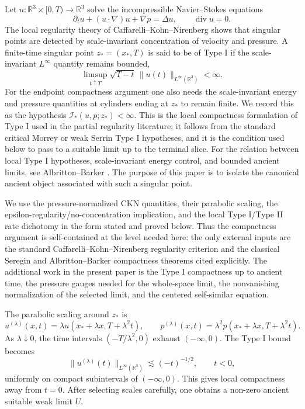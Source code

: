 \documentclass[11pt]{amsart}
\theoremstyle{plain}
\theoremstyle{definition}
\theoremstyle{remark}
\numberwithin{equation}{section}
\newcommand{\R}{\mathbb R}
\newcommand{\divergence}{\operatorname{div}}
\newcommand{\calI}{\mathcal I}
\begin{document}
Let \(u:\R^3\times[0,T)\to\R^3\) solve the incompressible Navier--Stokes
equations
\begin{equation}\label{eq:NS}
   \partial_t u+(u\cdot\nabla)u+\nabla p=\Delta u,\qquad
   \divergence u=0.
\end{equation}
The local regularity theory of Caffarelli--Kohn--Nirenberg
\cite{CKN1982} shows that singular points are detected by scale-invariant
concentration of velocity and pressure.  A finite-time singular point
\(z_*=(x_*,T)\) is said to be of Type I if the scale-invariant \(L^\infty\)
quantity remains bounded,
\begin{equation}\label{eq:type-I-bound-intro}
   \limsup_{t\uparrow T}\sqrt{T-t}\,
   \|u(t)\|_{L^\infty(\R^3)}<\infty.
\end{equation}
For the endpoint compactness argument one also needs the scale-invariant
energy and pressure quantities at cylinders ending at \(z_*\) to remain
finite.  We record this as the hypothesis
\(\calI_*(u,p;z_*)<\infty\).  This is the local compactness formulation of
Type I used in the partial regularity literature; it follows from the standard
critical Morrey or weak Serrin Type I hypotheses, and it is the condition used
below to pass to a suitable limit up to the terminal slice.
For the relation between local Type I hypotheses, scale-invariant energy
control, and bounded ancient limits, see Albritton--Barker
\cite[Theorem 1.1]{AlbrittonBarker2019}.
The purpose of this paper is to isolate the canonical ancient object associated
with such a singular point.

We use the pressure-normalized CKN quantities, their parabolic scaling, the
epsilon-regularity/no-concentration implication, and the local Type I/Type II
rate dichotomy in the form stated and proved below.  Thus the compactness
argument is self-contained at the level needed here: the only external inputs
are the standard Caffarelli--Kohn--Nirenberg regularity criterion and the
classical Seregin and Albritton--Barker compactness theorems cited explicitly.
The additional work in the present paper is the Type I compactness up to
ancient time, the pressure gauges needed for the whole-space limit, the
nonvanishing normalization of the selected limit, and the centered
self-similar equation.

The parabolic scaling around \(z_*\) is
\begin{equation}\label{eq:basic-rescaling-intro}
   u^{(\lambda)}(x,t)
   =
   \lambda u(x_*+\lambda x,T+\lambda^2t),\qquad
   p^{(\lambda)}(x,t)
   =
   \lambda^2 p(x_*+\lambda x,T+\lambda^2t).
\end{equation}
As \(\lambda\downarrow0\), the time intervals
\(( -T/\lambda^2,0)\) exhaust \((-\infty,0)\).  The Type I bound becomes
\[
   \|u^{(\lambda)}(t)\|_{L^\infty(\R^3)}
   \lesssim (-t)^{-1/2},
   \qquad t<0,
\]
uniformly on compact subintervals of \((-\infty,0)\).  This gives local
compactness away from \(t=0\).  After selecting scales carefully, one obtains a
non-zero ancient suitable weak limit \(U\).
\end{document}
